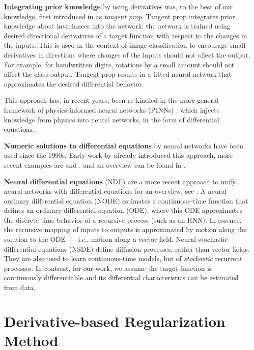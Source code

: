 \documentclass[conference]{IEEEtran}
\begin{document}
\textbf{Integrating prior knowledge} by using derivatives was, to the best of our knowledge, first introduced in
\cite{LeCun91} as \emph{tangent prop}. 
Tangent prop integrates prior knowledge about invariances into the network: the network is trained using desired directional derivatives of a target function with respect to the changes in the inputs. 
This is used in the context of image classification to encourage small derivatives in directions where changes of the inputs should not affect the output. 
For example, for handwritten digits, rotations by a small amount should not affect the class output. 
Tangent prop results in a fitted neural network that approximates the desired differential behavior. 

This approach has, in recent years, been re-kindled in the more general framework of physics-informed neural networks (PINNs) \cite{raissi2019physics,cuomo2022scientific}, which injects knowledge from physics into neural networks, in the form of differential equations. 

\textbf{Numeric solutions to differential equations} by neural networks have been used since the 1990s. 
Early work by \cite{lee1990neural} already introduced this approach, more recent examples are \cite{parisi2003solving} and \cite{malek2006numerical}, and an overview can be found in \cite{beck2023overview}.

\textbf{Neural differential equations} (NDE) are a more recent approach to unify neural networks with differential equations for an overview, see \cite{Kidger22}.
A neural ordinary differential equation (NODE) \cite{NEURIPS2018_Chen} estimates a continuous-time function that defines an ordinary differential equation (ODE), where this ODE approximates the discrete-time behavior of a recursive process (such as an RNN). In essence, the recursive mapping of inputs to outputs is approximated by motion along the solution to the ODE~--- i.e., motion along a vector field.
Neural stochastic differential equations (NSDE) \cite{tzen2019neural} define diffusion processes, rather than vector fields. 
They are also used to learn continuous-time models, but of \textit{stochastic} recurrent processes. 
In contrast, for our work, we assume the target function is continuously differentiable and its differential characteristics can be estimated from data. 



\section{Derivative-based Regularization Method}\label{sec:method}
\end{document}
